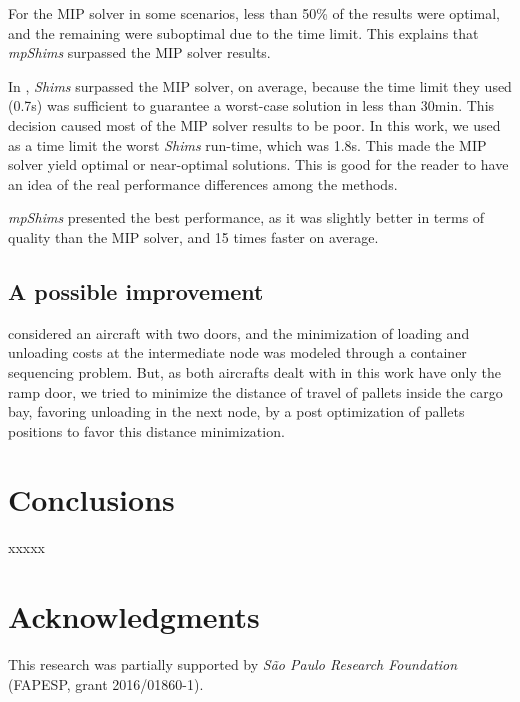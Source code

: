 \documentclass[preprint,authoryear]{elsarticle}
\begin{document}
For the MIP solver in some scenarios, less than 50\% of the results were optimal, and the remaining were suboptimal due to the time limit. This explains that {\it mpShims} surpassed the MIP solver results. 

In \cite{MesquitaSanches2023}, {\it Shims} surpassed the MIP solver, on average, because the time limit they used (0.7s) was sufficient to guarantee a worst-case solution in less than 30min. This decision caused most of the MIP solver results to be poor. In this work, we used as a time limit the worst {\it Shims} run-time, which was 1.8s. This made the MIP solver yield optimal or near-optimal solutions. This is good for the reader to have an idea of the real performance differences among the methods.

{\it mpShims} presented the best performance, as it was slightly better in terms of quality than the MIP solver, and 15 times faster on average.


\subsection{A possible improvement}

\cite{LurkinSchyns2015} considered an aircraft with two doors, and the minimization of loading and unloading costs at the intermediate node was modeled through a container sequencing problem. But, as both aircrafts dealt with in this work have only the ramp door, we tried to minimize the distance of travel of pallets inside the cargo bay, favoring unloading in the next node, by a post optimization of pallets positions to favor this distance minimization.

\section{Conclusions}
\label{sec7}

xxxxx

\section*{Acknowledgments}

This research was partially supported by \textit{São Paulo Research Foundation} (FAPESP, grant 2016/01860-1).




\end{document}
